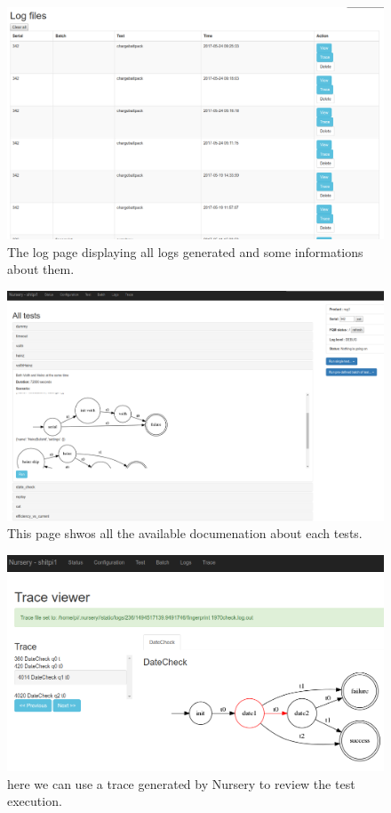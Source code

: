 \documentclass[12pt]{article}
\begin{document}
\begin{figure}
    \centering
    \includegraphics[scale=0.4]{wa_logs.png}
    \caption{The log page displaying all logs generated and some informations about them.}
    \label{wa_logs}
\end{figure}

\begin{figure}
    \centering
    \includegraphics[scale=0.2]{wa_tests_doc.png}
    \caption{This page shwos all the available documenation about each tests.}
    \label{wa_tests_doc}
\end{figure}

\begin{figure}
    \centering
    \includegraphics[scale=0.4]{wa_trace.png}
    \caption{here we can use a trace generated by Nursery to review the test execution.}
    \label{wa_trace}
\end{figure}
\end{document}
